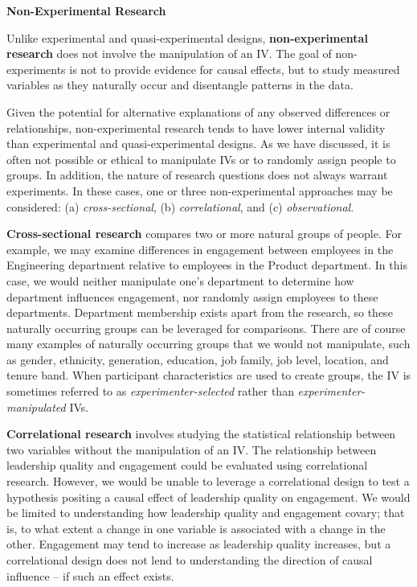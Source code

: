 \documentclass[]{book}
\begin{document}
\textbf{Non-Experimental Research}

Unlike experimental and quasi-experimental designs, \textbf{non-experimental research} does not involve the manipulation of an IV. The goal of non-experiments is not to provide evidence for causal effects, but to study measured variables as they naturally occur and disentangle patterns in the data.

Given the potential for alternative explanations of any observed differences or relationships, non-experimental research tends to have lower internal validity than experimental and quasi-experimental designs. As we have discussed, it is often not possible or ethical to manipulate IVs or to randomly assign people to groups. In addition, the nature of research questions does not always warrant experiments. In these cases, one or three non-experimental approaches may be considered: (a) \emph{cross-sectional}, (b) \emph{correlational}, and (c) \emph{observational}.

\textbf{Cross-sectional research} compares two or more natural groups of people. For example, we may examine differences in engagement between employees in the Engineering department relative to employees in the Product department. In this case, we would neither manipulate one's department to determine how department influences engagement, nor randomly assign employees to these departments. Department membership exists apart from the research, so these naturally occurring groups can be leveraged for comparisons. There are of course many examples of naturally occurring groups that we would not manipulate, such as gender, ethnicity, generation, education, job family, job level, location, and tenure band. When participant characteristics are used to create groups, the IV is sometimes referred to as \emph{experimenter-selected} rather than \emph{experimenter-manipulated} IVs.

\textbf{Correlational research} involves studying the statistical relationship between two variables without the manipulation of an IV. The relationship between leadership quality and engagement could be evaluated using correlational research. However, we would be unable to leverage a correlational design to test a hypothesis positing a causal effect of leadership quality on engagement. We would be limited to understanding how leadership quality and engagement covary; that is, to what extent a change in one variable is associated with a change in the other. Engagement may tend to increase as leadership quality increases, but a correlational design does not lend to understanding the direction of causal influence -- if such an effect exists.
\end{document}
